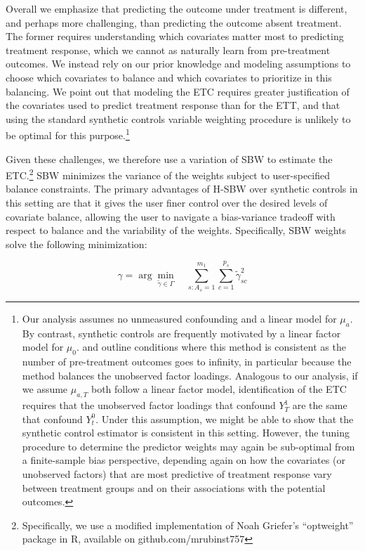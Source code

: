 \documentclass[article]{imsart}
\theoremstyle{plain}
\theoremstyle{remark}
\begin{document}
Overall we emphasize that predicting the outcome under treatment is different, and perhaps more challenging, than predicting the outcome absent treatment. The former requires understanding which covariates matter most to predicting treatment response, which we cannot as naturally learn from pre-treatment outcomes. We instead rely on our prior knowledge and modeling assumptions to choose which covariates to balance and which covariates to prioritize in this balancing. We point out that modeling the ETC requires greater justification of the covariates used to predict treatment response than for the ETT, and that using the standard synthetic controls variable weighting procedure is unlikely to be optimal for this purpose.\footnote{Our analysis assumes no unmeasured confounding and a linear model for $\mu_a$. By contrast, synthetic controls are frequently motivated by a linear factor model for $\mu_0$. \cite{abadie2010synthetic} and \cite{ferman2016revisiting} outline conditions where this method is consistent as the number of pre-treatment outcomes goes to infinity, in particular because the method balances the unobserved factor loadings. Analogous to our analysis, if we assume $\mu_{a, T}$ both follow a linear factor model, identification of the ETC requires that the unobserved factor loadings that confound $Y^1_T$ are the same that confound $Y^0_t$. Under this assumption, we might be able to show that the synthetic control estimator is consistent in this setting. However, the tuning procedure to determine the predictor weights may again be sub-optimal from a finite-sample bias perspective, depending again on how the covariates (or unobserved factors) that are most predictive of treatment response vary between treatment groups and on their associations with the potential outcomes.}

Given these challenges, we therefore use a variation of SBW to estimate the ETC.\footnote{Specifically, we use a modified implementation of Noah Griefer's ``optweight'' package in R, available on github.com/mrubinst757} SBW minimizes the variance of the weights subject to user-specified balance constraints. The primary advantages of H-SBW over synthetic controls in this setting are that it gives the user finer control over the desired levels of covariate balance, allowing the user to navigate a bias-variance tradeoff with respect to balance and the variability of the weights. Specifically, SBW weights solve the following minimization:

\begin{equation}
\gamma = \arg\min_{\tilde{\gamma} \in \Gamma} \quad \sum_{s: A_s = 1}^{m_1}\sum_{c = 1}^{p_s} \tilde{\gamma}_{sc}^2  
\end{equation}
\end{document}
